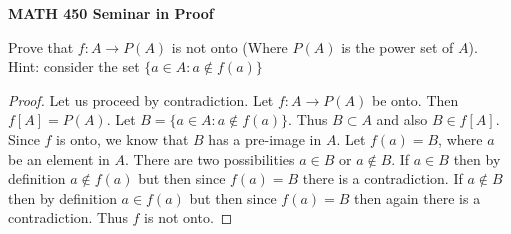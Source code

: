 \documentclass[14pt, fullpage]{article}
\begin{document}
\begin{center}
		
{\bf MATH 450 Seminar in Proof}
 \\
\end{center}
	Prove that $f:A \rightarrow P(A)$ is not onto (Where $P(A)$ is the power set of $A$). Hint: consider the set $\{a \in A: a \notin f(a)\}$
\begin{proof}
	Let us proceed by contradiction. Let $f:A \rightarrow P(A)$ be onto. Then $f[A] = P(A)$. Let $B = \{a \in A: a \notin f(a)\}$. Thus $B \subset A$ and also $B \in f[A]$. Since $f$ is onto, we know that $B$ has a pre-image in $A$. Let $f(a) = B$, where $a$ be an element in $A$. There are two possibilities $a \in B$ or $a \notin B$. If $a \in B$ then by definition $a \notin f(a)$ but then since $f(a) = B$ there is a contradiction. If $a \notin B$ then by definition $a \in f(a)$ but then since $f(a) = B$ then again there is a contradiction. Thus $f$ is not onto.
\end{proof}
\end{document}
